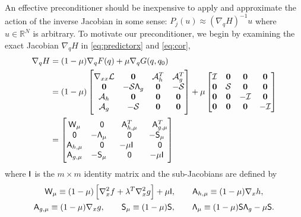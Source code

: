 An effective preconditioner should be inexpensive to apply and approximate the
action of the inverse Jacobian in some sense: $P_j(u) \approx (\nabla_q H)^{-1}
u$ where $u \in \mathbb{R}^{N}$ is arbitrary.  To motivate our preconditioner,
we begin by examining the exact Jacobian $\nabla_q H$ in  \eqref{eq:predictorx} and \eqref{eq:cor}, 
\begin{equation}\label{eq:dHdq}
\begin{aligned}
\nabla_q H &= (1 - \mu) \nabla_{q} F(q) + \mu \nabla_q G(q,q_0) \\
&=  (1-\mu)\begin{bmatrix}
 \nabla_{xx} \mathcal{L}   & \boldsymbol{0} & \mathcal{A}^T_h   & \mathcal{A}^T_g   \\
\boldsymbol{0}     &   -\mathcal{S} \mathsf{\Lambda}_g   & \boldsymbol{0} & -\mathcal{S}     \\
\mathcal{A}_h  &  \boldsymbol{0}   & \boldsymbol{0} &  \boldsymbol{0}  \\
\mathcal{A}_g  & -\mathcal{S}  &  \boldsymbol{0}  & \boldsymbol{0}   \\
\end{bmatrix}
+ \mu \begin{bmatrix}
\mathcal{I} & \boldsymbol{0} & \boldsymbol{0} & \boldsymbol{0} \\
\boldsymbol{0}  & \mathcal{S}  & \boldsymbol{0} & \boldsymbol{0} \\
\boldsymbol{0} & \boldsymbol{0} & -\mathcal{I} &  \boldsymbol{0} \\
\boldsymbol{0} & \boldsymbol{0} &   \boldsymbol{0} & -\mathcal{I} 
\end{bmatrix} \\
& = \begin{bmatrix}
	\mathsf{W}_\mu & \phantom{-}\mathsf{0} & \phantom{-}\mathsf{A}_{h,\mu}^T  & \phantom{-}\mathsf{A}_{g,\mu}^T \\
	\mathsf{0}  & -\mathsf{\Lambda}_\mu & \phantom{-}\mathsf{0}   & -\mathsf{S}_\mu \\
	\mathsf{A}_{h, \mu} & \phantom{-}\mathsf{0} &  -\mu \mathsf{I} & \phantom{-}\mathsf{0}  \\
	\mathsf{A}_{g, \mu} & -\mathsf{S}_\mu &  \phantom{-}\mathsf{0}     &   -\mu \mathsf{I}
\end{bmatrix}
\end{aligned}
\end{equation}
where $\mathsf{I}$ is the $m\times m$ identity matrix and the sub-Jacobians are
defined by
\begin{gather*}
	\mathsf{W}_{\mu} \equiv (1-\mu) \left[\nabla_x^2 f + \lambda^T \nabla_x^2 g\right] + \mu \mathsf{I},\qquad
	\mathsf{A}_{h, \mu} \equiv (1-\mu) \nabla_x h, \\
	\mathsf{A}_{g, \mu} \equiv (1-\mu) \nabla_x g, \qquad 
	\mathsf{S}_{\mu} \equiv (1-\mu)\mathsf{S},\qquad
	\mathsf{\Lambda}_\mu \equiv (1-\mu) \mathsf{S} \mathsf{\Lambda}_g - \mu \mathsf{S}. 
\end{gather*}

